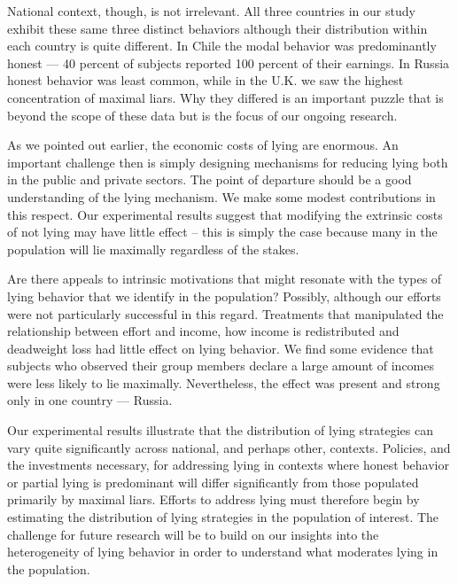 \documentclass[12pt]{article}
\begin{document}
\par National context, though, is not irrelevant.  All three countries in our study exhibit these same three distinct behaviors although their distribution within each country is quite different.  In Chile the modal behavior was predominantly honest --- 40 percent of subjects reported 100 percent of their earnings. In Russia honest behavior was least common, while in the U.K. we saw the highest concentration of maximal liars.  Why they differed is an important puzzle that is beyond the scope of these data but is the focus of our ongoing research. 

\par As we pointed out earlier, the economic costs of lying are enormous.  An important challenge then is simply designing mechanisms for reducing lying both in the public and private sectors. The point of departure should be a good understanding of the lying mechanism.  We make some modest contributions in this respect.  Our experimental results suggest that modifying the extrinsic costs of not lying may have little effect -- this is simply the case because many in the population will lie maximally regardless of the stakes.  

\par Are there appeals to intrinsic motivations that might resonate with the types of lying behavior that we identify in the population?  Possibly, although our efforts were not particularly successful in this regard.  Treatments that manipulated the relationship between effort and income, how income is redistributed and deadweight loss had little effect on lying behavior. We find some evidence that subjects who observed their group members declare a large amount of incomes were less likely to lie maximally. Nevertheless, the effect was present and strong only in one country --- Russia.    

\par Our experimental results illustrate that the distribution of lying strategies can vary quite significantly across national, and perhaps other, contexts. Policies, and the investments necessary, for addressing lying in contexts where honest behavior or partial lying is predominant will differ significantly from those populated primarily by maximal liars. Efforts to address lying must therefore begin by estimating the distribution of lying strategies in the population of interest.  The challenge for future research will be to build on our insights into the heterogeneity of lying behavior in order to understand what moderates lying in the population. 
\end{document}
